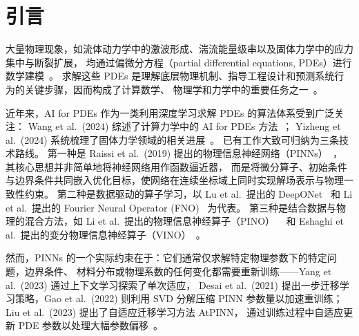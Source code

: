 \section{引言}
\label{sec:intro}

大量物理现象，如流体动力学中的激波形成、湍流能量级串以及固体力学中的应力集中与断裂扩展，
均通过偏微分方程（partial differential equations, PDEs）进行数学建模~\cite{evans2010pde}。
求解这些 PDEs 是理解底层物理机制、指导工程设计和预测系统行为的关键步骤，因而构成了计算数学、
物理学和力学中的重要任务之一~\cite{leveque2007finite}。

近年来，AI for PDEs 作为一类利用深度学习求解 PDEs 的算法体系受到广泛关注：
Wang et al.\ (2024) 综述了计算力学中的 AI for PDEs 方法~\cite{wang2024aipdesurvey}；
Yizheng et al.\ (2024) 系统梳理了固体力学领域的相关进展~\cite{wang2024aisolid}。
已有工作大致可归纳为三条技术路线。
第一种是 Raissi et al.\ (2019) 提出的物理信息神经网络（PINNs）~\cite{raissi2019pinn}，
其核心思想并非简单地将神经网络用作函数逼近器，
而是将微分算子、初始条件与边界条件共同嵌入优化目标，使网络在连续坐标域上同时实现解场表示与物理一致性约束。
第二种是数据驱动的算子学习，以 Lu et al.\ 提出的 DeepONet~\cite{lu2021deeponet} 和 Li et al.\ 提出的
Fourier
Neural Operator (FNO)~\cite{li2021fno} 为代表。
第三种是结合数据与物理的混合方法，如 Li et al.\ 提出的物理信息神经算子（PINO）
~\cite{li2024pino} 和 Eshaghi et al.\ 提出的变分物理信息神经算子（VINO）~\cite{eshaghi2025vino}。

然而，PINNs 的一个实际约束在于：它们通常仅求解特定物理参数下的特定问题，边界条件、
材料分布或物理系数的任何变化都需要重新训练——Yang et al.\ (2023) 通过上下文学习探索了单次适应，
Desai et al.\ (2021) 提出一步迁移学习策略，Gao et al.\ (2022) 则利用 SVD 分解压缩 PINN 参数量以加速重训练；
Liu et al.\ (2023) 提出了自适应迁移学习方法 AtPINN，
通过训练过程中自适应更新 PDE 参数以处理大幅参数偏移~\cite{yang2023incontext,desai2021oneshot,
gao2022svdpinns,liu2023atpinn}。
